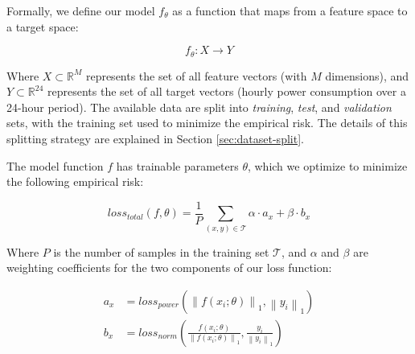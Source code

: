 
Formally, we define our model $f_\theta$ as a function that maps from a feature space to a target space:

\[
    f_{\theta}: X \rightarrow Y
\]

Where $X \subset \mathbb{R}^M$ represents the set of all feature vectors (with $M$ dimensions), and $Y \subset \mathbb{R}^{24}$ represents the set of all target vectors (hourly power consumption over a 24-hour period). The available data are split into \textit{training}, \textit{test}, and \textit{validation} sets, with the training set used to minimize the empirical risk. The details of this splitting strategy are explained in Section \ref{sec:dataset-split}.


The model function $f$ has trainable parameters $\theta$, which we optimize to minimize the following empirical risk:

\begin{equation}
    \mathit{loss_{total}}(f,\theta) = \frac{1}{P} \sum_{(x,y)\in\mathcal{T}} \alpha \cdot a_x + \beta \cdot b_x
\end{equation}

Where $P$ is the number of samples in the training set $\mathcal{T}$, and $\alpha$ and $\beta$ are weighting coefficients for the two components of our loss function:

\begin{equation}
    \begin{split}
        a_x & = \mathit{loss_{power}}
        (\left \lVert f(x_i;\theta) \right \rVert_{1}, \left \lVert y_i \right \rVert_{1}) \\
        b_x & = \mathit{loss_{norm}}
        (\frac{f(x_i;\theta)}{\left \lVert f(x_i;\theta) \right \rVert_{1}}, \frac{y_i}{\left \lVert y_i \right \rVert_{1}})
    \end{split}
\end{equation}

